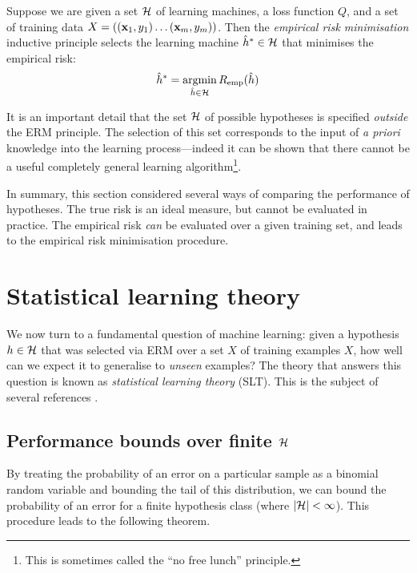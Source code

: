 \begin{definition}
Suppose we are given a set $\mathcal{H}$ of learning machines, a loss
function $Q$, and a set of training data $X = ((\mathbf{x}_1, y_1) \ldots
(\mathbf{x}_m,y_m))$.  Then the \emph{empirical risk minimisation} inductive
principle selects the learning machine $\hat{h}^{\ast} \in \mathcal{H}$ that
minimises the empirical risk:
%
\begin{equation}
\hat{h}^{\ast} = \argmin_{\hat{h} \in \calH} R_{\emp}(\hat{h})
\label{eqn:erm}
\end{equation}
\end{definition}

It is an important detail that the set $\mathcal{H}$ of possible
hypotheses is specified \emph{outside} the ERM principle.  The
selection of this set corresponds to the input of \emph{a priori}
knowledge into the learning process---indeed it can be shown that
there cannot be a useful completely general learning
algorithm\footnote{This is sometimes called the ``no free lunch''
principle.}. 

In summary, this section considered several ways of comparing the
performance of hypotheses.  The true risk is an ideal measure, but cannot be
evaluated in practice.  The empirical risk \emph{can} be evaluated over a
given training set, and leads to the empirical risk minimisation
procedure.

\section{Statistical learning theory}
\label{sec:slt}
\label{acr:slt}

We now turn to a fundamental question of machine learning: given a
hypothesis $h \in \mathcal{H}$ that was selected via ERM over a set $X$ of
training examples $X$, how well can we expect it to generalise to 
\emph{unseen} examples?  The theory that answers this question is
known as \emph{statistical learning theory} (SLT).  This is the
subject of several references 
\cite{Vapnik98, Cherkassky98, Bartlett98a}.

\subsection{Performance bounds over finite $\mathcal{H}$}

By treating the probability of an error on a particular sample as a
binomial random variable and bounding the tail of this distribution,
we can bound the probability of an error for a finite hypothesis class
(where $|\mathcal{H}| < \infty$).  This procedure leads to the following
theorem.

